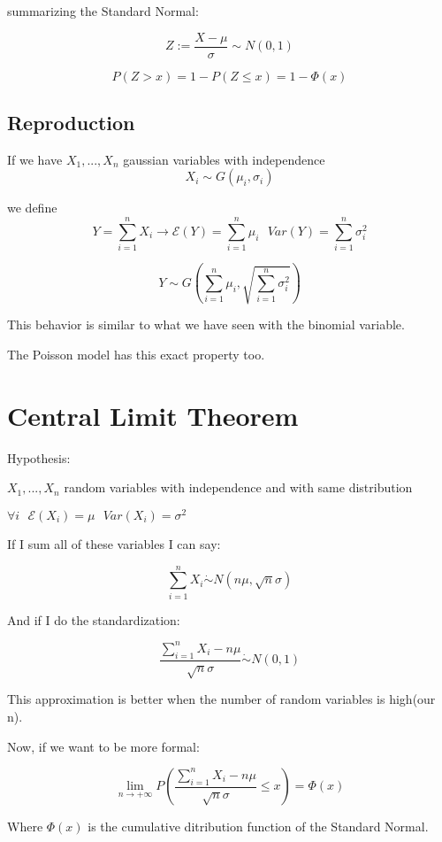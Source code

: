 \documentclass{article}
\begin{document}
\bigskip

summarizing the Standard Normal:

$$Z:= \frac{X -\mu}{\sigma} \sim N(0,1)$$

$$P(Z > x) = 1 - P(Z \leq x) = 1 - \Phi(x)$$

\subsection{Reproduction}

If we have $X_1,...,X_n$ gaussian variables with independence $$X_i \sim G(\mu_i,\sigma_i)$$

we define $$Y = \sum_{i=1}^n X_i \longrightarrow \mathcal E(Y) = \sum_{i=1}^n\mu_i \ \ \ Var(Y) = \sum_{i=1}^n \sigma_i^2$$

$$Y \sim G\left(\sum_{i=1}^n \mu_i, \sqrt{\sum_{i=1}^n \sigma_i^2}\right)$$

This behavior is similar to what we have seen with the binomial variable.

The Poisson model has this exact property too.

\section{Central Limit Theorem}

Hypothesis:

$X_1,...,X_n$ random variables with independence and with same distribution

$\forall i \ \ \ \mathcal E(X_i) = \mu \ \ \ Var(X_i) = \sigma^2$

\bigskip

If I sum all of these variables I can say:

$$\sum_{i=1}^n X_i \dot \sim N(n\mu,\sqrt{n}\sigma)$$

\bigskip

\bigskip

And if I do the standardization:

$$\frac{\sum_{i=1}^n X_i - n\mu}{\sqrt{n}\sigma} \dot \sim N(0,1)$$

This approximation is better when the number of random variables is high(our n).

Now, if we want to be more formal:

$$\lim_{n \rightarrow +\infty} P\left(\frac{\sum_{i=1}^n X_i - n\mu}{\sqrt{n} \sigma} \leq x\right) = \Phi(x)$$

Where $\Phi(x)$ is the cumulative ditribution function of the Standard Normal.
\end{document}
